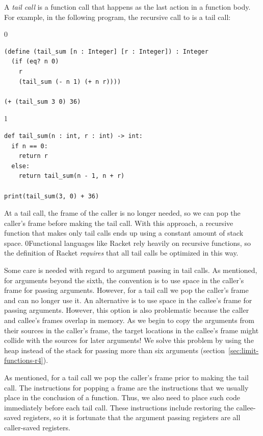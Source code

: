 \documentclass[7x10]{TimesAPriori_MIT}%
\def\racketEd{0}
\def\pythonEd{1}
\providecommand{\BookEdition}{1}
\let\edition\BookEdition
\newcommand{\racket}[1]{{\if\edition\racketEd{#1}\fi}}
\newcommand{\pythonColor}[0]{}
\numberwithin{theorem}{chapter}
\numberwithin{definition}{chapter}
\numberwithin{equation}{chapter}
\begin{document}
A \emph{tail call} is a function call that
happens as the last action in a function body.  For example, in the
following program, the recursive call to  is a tail
call:
\begin{center}
{\if\edition\racketEd  
\begin{lstlisting}
(define (tail_sum [n : Integer] [r : Integer]) : Integer
  (if (eq? n 0) 
    r
    (tail_sum (- n 1) (+ n r))))

(+ (tail_sum 3 0) 36)
\end{lstlisting}
\fi}
{\if\edition\pythonEd\pythonColor
\begin{lstlisting}
def tail_sum(n : int, r : int) -> int:
  if n == 0:
    return r
  else:
    return tail_sum(n - 1, n + r)

print(tail_sum(3, 0) + 36)
\end{lstlisting}
\fi}
\end{center}
At a tail call, the frame of the caller is no longer needed, so we can
pop the caller's frame before making the tail
call.  With this approach, a recursive function
that makes only tail calls ends up using a constant amount of stack
space.  \racket{Functional languages like Racket rely heavily on
  recursive functions, so the definition of Racket \emph{requires}
  that all tail calls be optimized in this way.}

Some care is needed with regard to argument passing in tail calls.  As
mentioned, for arguments beyond the sixth, the convention is to use
space in the caller's frame for passing arguments.  However, for a
tail call we pop the caller's frame and can no longer use it.  An
alternative is to use space in the callee's frame for passing
arguments. However, this option is also problematic because the caller
and callee's frames overlap in memory.  As we begin to copy the
arguments from their sources in the caller's frame, the target
locations in the callee's frame might collide with the sources for
later arguments! We solve this problem by using the heap instead of
the stack for passing more than six arguments
(section~\ref{sec:limit-functions-r4}).

As mentioned, for a tail call we pop the caller's frame prior to
making the tail call. The instructions for popping a frame are the
instructions that we usually place in the conclusion of a
function. Thus, we also need to place such code immediately before
each tail call. These instructions include restoring the callee-saved
registers, so it is fortunate that the argument passing registers are
all caller-saved registers.
\end{document}
